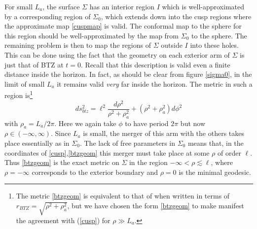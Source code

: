 \documentclass[12pt]{article}
\numberwithin{equation}{section}
\begin{document}
For small $L_a$, the surface $\Sigma$ has an interior region $I$ which is well-approximated by a corresponding region of $\Sigma_0$, which extends down into the cusp regions where the approximate map \eqref{cuspmap} is valid. The conformal map to the sphere for this region should be well-approximated by the map from $\Sigma_0$ to the sphere. The remaining problem is then to map the regions of $\Sigma$ outside $I$ into these holes. This can be done using the fact that the geometry on each exterior arm of $\Sigma$ is just that of BTZ at $t=0$.  Recall that this description is valid even a finite distance inside the horizon.  In fact, as should be clear from figure \ref{sigma0},  in the limit of small $L_a$ it remains valid {\it very} far inside the horizon.  The metric in such a region is\footnote{The metric \eqref{btzgeom} is equivalent to that of \cite{Banados:1992wn} when written in terms of $r_{BTZ} = \sqrt{\rho^2 + \rho_a^2}$, but we have chosen the form \eqref{btzgeom} to make manifest the agreement with (\ref{cusp}) for $\rho \gg L_a$.}
\begin{equation}
\label{btzgeom}
ds^2_{btz} = \ell^2 \frac{d\rho^2}{\rho^2 + \rho_a^2} + \left(\rho^2 + \rho_a^2\right) d \phi^2
\end{equation}
with $\rho_a = L_a /2\pi$. Here we again take $\phi$ to have period $2\pi$ but now $\rho \in (-\infty, \infty)$.  Since $L_a$ is small, the merger of this arm with the others takes place essentially as in $\Sigma_0$.   The lack of free parameters in $\Sigma_0$ means that, in the coordinates of \eqref{cusp},\eqref{btzgeom} this merger must take place at some $\rho$ of order $\ell$.  Thus \eqref{btzgeom} is the exact metric on $\Sigma$ in the region $- \infty <  \rho \lesssim \ell$, where $\rho = -\infty$ corresponds to the exterior boundary and $\rho=0$ is the minimal geodesic.
\end{document}
